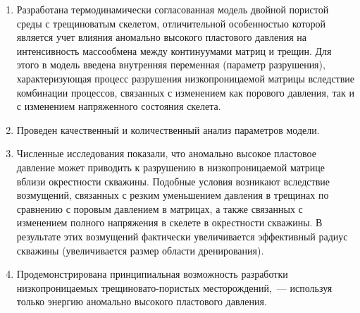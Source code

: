 \begin{enumerate}
  \item Разработана термодинамически согласованная модель двойной пористой среды с трещиноватым скелетом, отличительной особенностью которой является учет влияния аномально высокого пластового давления  на интенсивность массообмена между континуумами матриц и трещин. Для этого в модель введена внутренняя переменная (параметр разрушения), характеризующая процесс разрушения низкопроницаемой матрицы вследствие комбинации процессов, связанных с изменением как порового давления, так и с изменением напряженного состояния скелета.
  \item Проведен качественный и количественный анализ параметров модели.
  \item Численные исследования показали, что аномально высокое пластовое давление может приводить к разрушению в низкопроницаемой матрице вблизи окрестности скважины. Подобные условия возникают вследствие возмущений, связанных с резким уменьшением давления в трещинах по сравнению с поровым давлением в матрицах, а также связанных с изменением полного напряжения в скелете в окрестности скважины. В результате этих возмущений фактически увеличивается эффективный радиус скважины (увеличивается размер области дренирования).
  \item Продемонстрирована принципиальная возможность разработки низкопроницаемых трещиновато-пористых месторождений,~--- используя только энергию аномально высокого пластового давления.

\end{enumerate}
